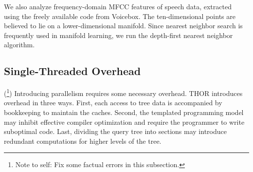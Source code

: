 \documentclass[twoside,leqno,twocolumn]{article}
\newcommand{\authornote}[1]{(\footnote{Note to self: #1})}
\newcommand{\authorsnote}[1]{\authornote{#1}}
\begin{document}
We also analyze frequency-domain MFCC features of speech data, extracted using the freely available code from Voicebox.
The ten-dimensional points are believed to lie on a lower-dimensional manifold.
Since nearest neighbor search is frequently used in manifold learning, we run the depth-first nearest neighbor algorithm.



\subsection{Single-Threaded Overhead}

\authorsnote{Fix some factual errors in this subsection.}
Introducing parallelism requires some necessary overhead.
THOR introduces overhead in three ways.
First, each access to tree data is accompanied by bookkeeping to maintain the caches.
Second, the templated programming model may inhibit effective compiler optimization and require the programmer to write suboptimal code.
Last, dividing the query tree into sections may introduce redundant computations for higher levels of the tree.
\end{document}
